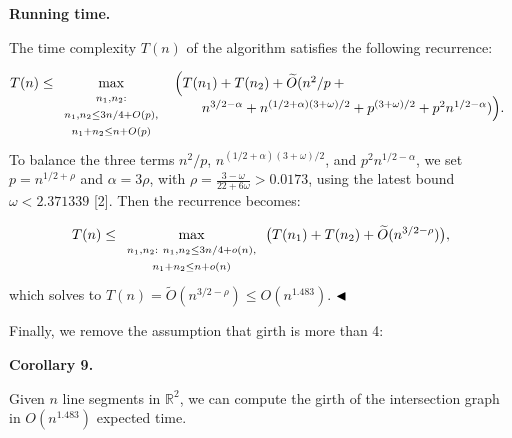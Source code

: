 \par
\par
\par\medskip\noindent\textbf{Running time.}\par
The time complexity $T(n)$ of the algorithm satisfies the following recurrence:
\par
\[\begin{aligned}
T(n)\leq\max_{\begin{array}[]{c}\scriptstyle{n_{1},n_{2}:}\\
\scriptstyle{n_{1},n_{2}\leq 3n/4+O(p),}\\
\scriptstyle{n_{1}+n_{2}\leq n+O(p)}\end{array}}\begin{array}[t]{l}\Big(T(n_{1%
})+T(n_{2})+\widetilde{O}(n^{2}/p+{}\\[2.15277pt]
\qquad n^{3/2-\alpha}+n^{(1/2+\alpha)(3+\omega)/2}+p^{(3+\omega)/2}+p^{2}n^{1/%
2-\alpha})\Big).\end{array}
\end{aligned}\]
To balance the three terms $n^{2}/p$, $n^{(1/2+\alpha)(3+\omega)/2}$, and $p^{2}n^{1/2-\alpha}$, we set $p=n^{1/2+\rho}$ and $\alpha=3\rho$, with $\rho=\frac{3-\omega}{22+6\omega}>0.0173$, using the latest bound $\omega<2.371339$ [2]. Then the recurrence becomes:
\par
\[\begin{aligned}
T(n)\leq\max_{\begin{array}[]{c}\scriptstyle{n_{1},n_{2}:\ n_{1},n_{2}\leq 3n/%
4+o(n),}\\
\scriptstyle{n_{1}+n_{2}\leq n+o(n)}\end{array}}\big(T(n_{1})+T(n_{2})+%
\widetilde{O}(n^{3/2-\rho})\big),
\end{aligned}\]
which solves to $T(n)=\widetilde{O}(n^{3/2-\rho})\leq O(n^{1.483})$. $\hfill\blacktriangleleft$
\par
\par
Finally, we remove the assumption that girth is more than 4:
\par
\par
\par\medskip\noindent\textbf{Corollary 9.}\par
Given $n$ line segments in $\mathbb{R}^{2}$, we can compute the girth of the intersection graph in $O(n^{1.483})$ expected time.
